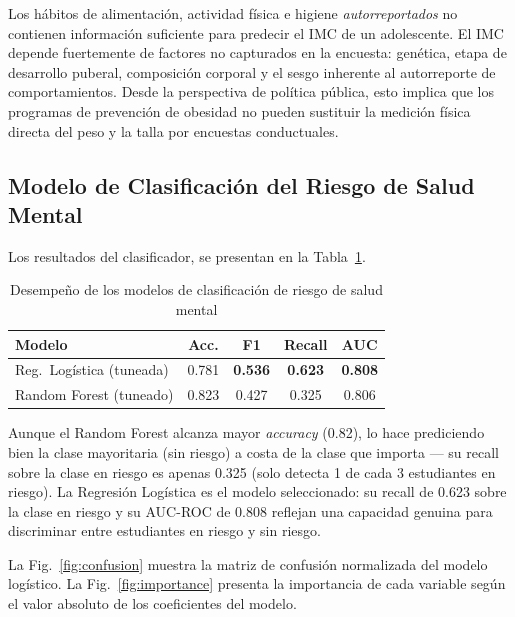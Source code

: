 \documentclass[conference]{IEEEtran}
\begin{document}
Los hábitos de alimentación, actividad física e higiene \textit{autorreportados} no contienen información suficiente para predecir el IMC de un adolescente. El IMC depende fuertemente de factores no capturados en la encuesta: genética, etapa de desarrollo puberal, composición corporal y el sesgo inherente al autorreporte de comportamientos. Desde la perspectiva de política pública, esto implica que los programas de prevención de obesidad no pueden sustituir la medición física directa del peso y la talla por encuestas conductuales.

\subsection{Modelo de Clasificación del Riesgo de Salud Mental}

Los resultados del clasificador, se presentan en la Tabla~\ref{tab:classification}.

\begin{table}[ht]
  \caption{Desempeño de los modelos de clasificación de riesgo de salud mental}
  \label{tab:classification}
  \centering
  \small
  \begin{tabular}{@{}lcccc@{}}
    \toprule
    \textbf{Modelo}           & \textbf{Acc.} & \textbf{F1}    & \textbf{Recall} & \textbf{AUC}   \\
    \midrule
    Reg.\ Logística (tuneada) & 0.781         & \textbf{0.536} & \textbf{0.623}  & \textbf{0.808} \\
    Random Forest (tuneado)   & 0.823         & 0.427          & 0.325           & 0.806          \\
    \bottomrule
  \end{tabular}
\end{table}

Aunque el Random Forest alcanza mayor \textit{accuracy} (0.82), lo hace prediciendo bien la clase mayoritaria (sin riesgo) a costa de la clase que importa --- su recall sobre la clase en riesgo es apenas 0.325 (solo detecta 1 de cada 3 estudiantes en riesgo). La Regresión Logística es el modelo seleccionado: su recall de 0.623 sobre la clase en riesgo y su AUC-ROC de 0.808 reflejan una capacidad genuina para discriminar entre estudiantes en riesgo y sin riesgo.

La Fig.~\ref{fig:confusion} muestra la matriz de confusión normalizada del modelo logístico. La Fig.~\ref{fig:importance} presenta la importancia de cada variable según el valor absoluto de los coeficientes del modelo.
\end{document}
